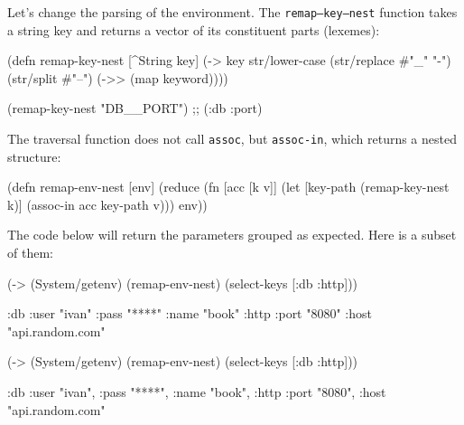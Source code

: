 \begin{english}
\end{english}

\mnoindent
Let's change the parsing of the environment. The \texttt{remap--key--nest} function takes a string key and returns a vector of its constituent parts (lexemes):

\begin{english}
  \begin{clojure}
(defn remap-key-nest
  [^String key]
  (-> key
      str/lower-case
      (str/replace #"_" "-")
      (str/split #"--")
      (->> (map keyword))))

(remap-key-nest "DB__PORT")
;; (:db :port)
  \end{clojure}
\end{english}


\noindent
The traversal function does not call \verb|assoc|, but \verb|assoc-in|, which returns a nested structure:

\begin{english}
  \begin{clojure}
(defn remap-env-nest
  [env]
  (reduce
   (fn [acc [k v]]
     (let [key-path (remap-key-nest k)]
       (assoc-in acc key-path v)))
   {}
   env))
  \end{clojure}
\end{english}

The code below will return the parameters grouped as expected. Here is a subset of them:

\ifx\DEVICETYPE\MOBILE

\begin{english}
  \begin{clojure}
(-> (System/getenv)
    (remap-env-nest)
    (select-keys [:db :http]))

{:db {:user "ivan"
      :pass "****"
      :name "book"}
 :http {:port "8080"
        :host "api.random.com"}}
  \end{clojure}
\end{english}

\else

\begin{english}
  \begin{clojure}
(-> (System/getenv)
    (remap-env-nest)
    (select-keys [:db :http]))

{:db {:user "ivan", :pass "****", :name "book"},
 :http {:port "8080", :host "api.random.com"}}
  \end{clojure}
\end{english}

